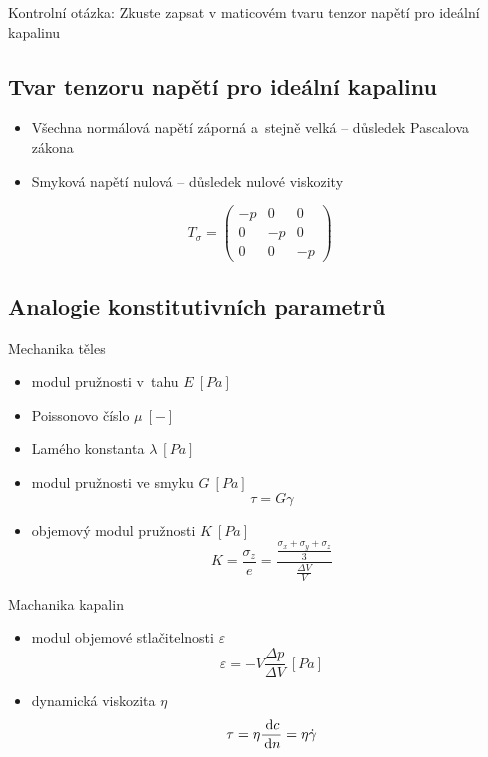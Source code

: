 Kontrolní otázka:
Zkuste zapsat v maticovém tvaru tenzor napětí pro ideální kapalinu
\subsection{Tvar tenzoru napětí pro ideální kapalinu}
\begin{itemize}
	\item Všechna normálová napětí záporná a~stejně velká -- důsledek Pascalova zákona
	\item Smyková napětí nulová -- důsledek nulové viskozity
\end{itemize}
\begin{equation}
T_\sigma = \left( \begin{matrix}
-p & 0 & 0\\
0 & -p & 0\\
0 & 0 & -p
\end{matrix} \right)
\end{equation}

\subsection{Analogie konstitutivních parametrů}
Mechanika těles
\begin{itemize}
	\item modul pružnosti v~tahu $E\:[Pa]$
	\item Poissonovo číslo $\mu\:[-]$
	\item Lamého konstanta $\lambda\:[Pa]$
	\item modul pružnosti ve smyku $G\:[Pa]$
	\begin{equation}
	\tau = G \gamma
	\end{equation}
	\item objemový modul pružnosti $K\:[Pa]$
	\begin{equation}
	K = \frac{\sigma_z}{e} = \frac{\frac{\sigma_x + \sigma_y + \sigma_z}{3}}{\frac{\Delta V}{V}}
	\end{equation}
\end{itemize}

Machanika kapalin
\begin{itemize}
	\item modul objemové stlačitelnosti $\varepsilon$
	\begin{equation}
		\varepsilon = -V \frac{\Delta p}{\Delta V}\:[Pa]
	\end{equation}
	\item dynamická viskozita $\eta$
	\begin{equation}
		\tau = \eta \frac{\,\mathrm{d} c}{\,\mathrm{d} n} = \eta \dot{\gamma}
	\end{equation}
\end{itemize}

